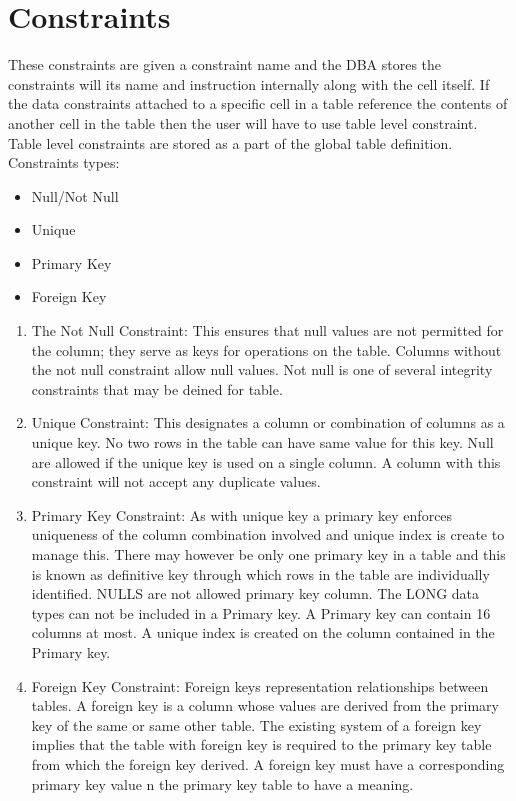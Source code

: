 \section{Constraints}
These constraints are given a constraint name and the DBA stores the constraints will its name and instruction internally along with the cell itself. If the data constraints attached to a specific cell in a table reference the contents of another cell in the table then the user will have to use table level constraint. Table level constraints are stored as a part of the global table definition. Constraints types:
\begin{itemize}
\item Null/Not Null
\item Unique
\item Primary Key
\item Foreign Key
\end{itemize}
\vspace{.5mm}
\begin{enumerate}
\item The Not Null Constraint: This ensures that null values are not permitted for the column; they serve as keys for operations on the table. Columns without the not null constraint allow null values. Not null is one of several integrity constraints that may be deined for table.
\item Unique Constraint: This designates a column or combination of columns as a unique key. No two rows in the table can have same value for this key. Null are allowed if the unique key is used on a single column. A column with this constraint will not accept any duplicate values.
\item Primary Key Constraint: As with unique key a primary key enforces uniqueness of the column combination involved and unique index is create to manage this. There may however be only one primary key in a table and this is known as definitive key through which rows in the table are individually identified. NULLS are not allowed primary key column. The LONG data types can not be included in a Primary key. A Primary key can contain 16 columns at most. A unique index is created on the column contained in the Primary key.
\item Foreign Key Constraint: Foreign keys representation relationships between tables. A foreign key is a column whose values are derived from the primary key of the same or same other table. The existing system of a foreign key implies that the table with foreign key is required to the primary key table from which the foreign key derived. A foreign key must have a corresponding primary key value n the primary key table to have a meaning.
\end{enumerate}

